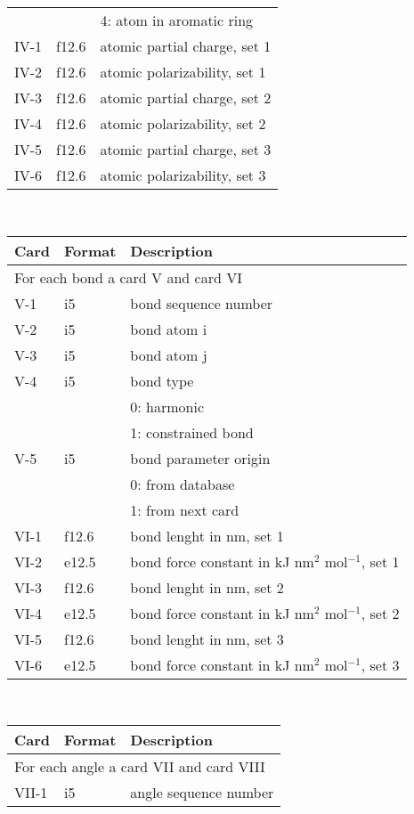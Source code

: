 \begin{center}
\begin{tabular}{lll}
      &        & 4: atom in aromatic ring\\
IV-1  & f12.6  & atomic partial charge, set 1\\
IV-2  & f12.6  & atomic polarizability, set 1\\
IV-3  & f12.6  & atomic partial charge, set 2\\
IV-4  & f12.6  & atomic polarizability, set 2\\
IV-5  & f12.6  & atomic partial charge, set 3\\
IV-6  & f12.6  & atomic polarizability, set 3\\
\hline
\end{tabular}\\
\begin{tabular}{lll}
\hline\hline
Card & Format & Description \\ \hline
\multicolumn{3}{l}{For each bond a card V and card VI} \\
V-1   & i5     & bond sequence number \\
V-2   & i5     & bond atom i \\
V-3   & i5     & bond atom j \\
V-4   & i5     & bond type \\
      &        & 0: harmonic\\
      &        & 1: constrained bond\\
V-5   & i5     & bond parameter origin\\
      &        & 0: from database \\
      &        & 1: from next card\\
VI-1  & f12.6  & bond lenght in nm, set 1\\
VI-2  & e12.5  & bond force constant in kJ nm$^2$ mol$^{-1}$, set 1 \\
VI-3  & f12.6  & bond lenght in nm, set 2\\
VI-4  & e12.5  & bond force constant in kJ nm$^2$ mol$^{-1}$, set 2 \\
VI-5  & f12.6  & bond lenght in nm, set 3\\
VI-6  & e12.5  & bond force constant in kJ nm$^2$ mol$^{-1}$, set 3 \\
\hline
\end{tabular}\\
\begin{tabular}{lll}
\hline\hline
Card & Format & Description \\ \hline
\multicolumn{3}{l}{For each angle a card VII and card VIII} \\
VII-1  & i5     & angle sequence number \\

\end{tabular}
\end{center}
